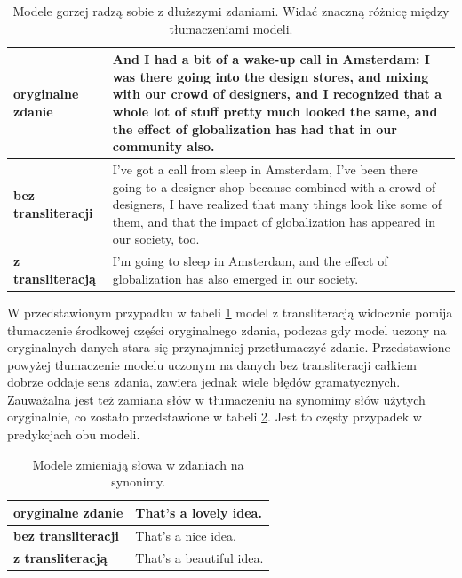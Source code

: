 \documentclass[
    left=2.5cm,         %
    right=2.5cm,        %
    top=2.5cm,          %
    bottom=3cm,         %
    bindingoffset=6mm,  %
    nohyphenation=false %
]{eiti/eiti-report}
\begin{document}
\begin{table}[H]
\centering
\footnotesize
\begin{tabular}{ |p{4cm}|p{10cm}|  }
    \hline
    \textbf{oryginalne zdanie} & And I had a bit of a wake-up call in Amsterdam: I was there going into the design stores, and mixing with our crowd of designers, and I recognized that a whole lot of stuff pretty much looked the same, and the effect of globalization has had that in our community also.\\
     \hline
     \textbf{bez transliteracji} & I've got a call from sleep in Amsterdam, I've been there going to a designer shop because combined with a crowd of designers, I have realized that many things look like some of them, and that the impact of globalization has appeared in our society, too. \\
     \hline
     \textbf{z transliteracją} & I'm going to sleep in Amsterdam, and the effect of globalization has also emerged in our society. \\
     \hline
\end{tabular}
\caption{Modele gorzej radzą sobie z dłuższymi zdaniami. Widać znaczną różnicę między tłumaczeniami modeli.}
\label{tab:long_sent_table}
\end{table}
W przedstawionym przypadku w tabeli \ref{tab:long_sent_table} model z transliteracją widocznie pomija tłumaczenie środkowej części oryginalnego zdania, podczas gdy model uczony na oryginalnych danych stara się przynajmniej przetłumaczyć zdanie. Przedstawione powyżej tłumaczenie modelu uczonym na danych bez transliteracji całkiem dobrze oddaje sens zdania, zawiera jednak wiele błędów gramatycznych. Zauważalna jest też zamiana słów w tłumaczeniu na synomimy słów użytych oryginalnie, co zostało przedstawione w tabeli \ref{tab:adjective_table}. Jest to częsty przypadek w predykcjach obu modeli.

\begin{table}[H]
\centering
\footnotesize
\begin{tabular}{ |p{4cm}|p{10cm}|  }
    \hline
    \textbf{oryginalne zdanie} & That's a lovely idea.\\
     \hline
     \textbf{bez transliteracji} & That's a nice idea. \\
     \hline
     \textbf{z transliteracją} & That's a beautiful idea. \\
     \hline
\end{tabular}
\caption{Modele zmieniają słowa w zdaniach na synonimy.}
\label{tab:adjective_table}
\end{table}
\end{document}
